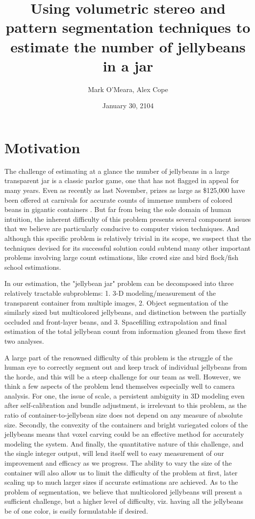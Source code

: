 \documentclass{article}
\begin{document}
\title{Using volumetric stereo and pattern segmentation techniques to estimate the number of jellybeans in a jar}
\author{Mark O'Meara, Alex Cope}
\date{January 30, 2104}
\maketitle

\section*{Motivation}

The challenge of estimating at a glance the number of jellybeans in a large transparent jar is a classic parlor game, one that has not flagged in appeal for many years. Even as recently as last November, prizes as large as \$125,000 have been offered at carnivals for accurate counts of immense numbers of colored beans in gigantic containers \cite{Diversion}. But far from being the sole domain of human intuition, the inherent difficulty of this problem presents several component issues that we believe are particularly conducive to computer vision techniques. And although this specific problem is relatively trivial in its scope, we suspect that the techniques devised for its successful solution could subtend many other important problems involving large count estimations, like crowd size and bird flock/fish school estimations.

   In our estimation, the "jellybean jar" problem can be decomposed into three relatively tractable subproblems: 1. 3-D modeling/measurement of the transparent container from multiple images, 2. Object segmentation of the similarly sized but multicolored jellybeans, and distinction between the partially occluded and front-layer beans, and 3. Spacefilling extrapolation and final estimation of the total jellybean count from information gleaned from these first two analyses.

   A large part of the renowned difficulty of this problem is the struggle of the human eye to correctly segment out and keep track of individual jellybeans from the horde, and this will be a steep challenge for our team as well. However, we think a few aspects of the problem lend themselves especially well to camera analysis. For one, the issue of scale, a persistent ambiguity in 3D modeling even after self-calibration and bundle adjustment, is irrelevant to this problem, as the ratio of container-to-jellybean size does not depend on any measure of absolute size. Secondly, the convexity of the containers and bright variegated colors of the jellybeans means that voxel carving could be an effective method for accurately modeling the system. And finally, the quantitative nature of this challenge, and the single integer output, will lend itself well to easy measurement of our improvement and efficacy as we progress. The ability to vary the size of the container will also allow us to limit the difficulty of the problem at first, later scaling up to much larger sizes if accurate estimations are achieved. As to the problem of segmentation, we believe that multicolored jellybeans will present a sufficient challenge, but a higher level of difficulty, viz. having all the jellybeans be of one color, is easily formulatable if desired.
\end{document}

